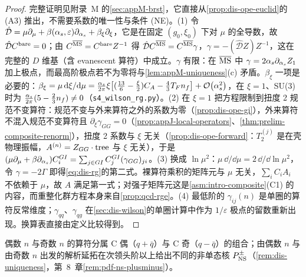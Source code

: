 \begin{proof}
完整证明见附录~M 的\cref{sec:appM-brst}，它直接从\cref{prop:dis-ope-euclid}的 (A3) 推出，不需要系数的唯一性与条件 (NE)。(1) 令 $\hat{\mathcal D}=\mu\partial_\mu+\beta(\alpha_s,\varepsilon)\partial_{\alpha_s}+\beta_\xi\partial_\xi$，它是在固定 $(g_0,\xi_0)$ 下对 $\mu$ 的全导数，故 $\hat{\mathcal D}C^{\rm bare}=0$；由 $C^{\overline{\rm MS}}=C^{\rm bare}Z^{-1}$ 得 $\hat{\mathcal D}C^{\overline{\rm MS}}=C^{\overline{\rm MS}}\gamma$，$\gamma=-(\hat{\mathcal D}Z)Z^{-1}$，这在完整的 $D$ 维基（含 evanescent 算符）中成立。$\gamma$ 有限：在 $\overline{\rm MS}$ 中 $\gamma=2\alpha_s\partial_{\alpha_s}Z_1$ 加上极点，而最高阶极点若不为零将与\cref{lem:appM-uniqueness}(c) 矛盾。$\beta_\xi$ 一项是必要的：$\beta_\xi=\mu\,\mathrm{d}\xi/\mathrm{d}\mu=\frac{\alpha_s}{2\pi}\xi\big[(\frac{13}6-\frac\xi2)C_A-\frac43T_Fn_f\big]+\mathcal{O}\!\left(\alpha_s^2\right)$，在 $\xi=1$、SU(3) 时为 $\frac{\alpha_s}{2\pi}(5-\frac23n_f)\ne0$（\texttt{s4\_wilson\_rg.py}）。(2) 在 $\xi=1$ 把方程限制到扭度 2 规范不变算符：规范不变与外来算符之外的系数为零（\cref{prop:dis-ope-gi}），外来算符不混入规范不变算符且 $\partial_\xi\gamma_{GG}=0$（\cref{prop:appJ-local-operators}、\cref{thm:prelim-composite-renorm}），扭度 2 系数与 $\xi$ 无关（\cref{prop:dis-ope-forward}：$T^{(j)}_2$ 是在壳物理振幅，$A^{(n)}=Z_{GG}\cdot{\rm tree}$ 与 $\xi$ 无关），于是 $(\mu\partial_\mu+\beta\partial_{\alpha_s})C^{GI}_i=\sum_{j\in GI}C^{GI}_j(\gamma_{GG})_{ji}$。(3) 换成 $\ln\mu^2$：$\mu\,\dd/\dd\mu=2\,\dd/\dd\ln\mu^2$，令 $\gamma=-2\Gamma$ 即得\cref{eq:dis-rg}的第二式。裸算符乘积的矩阵元与 $\mu$ 无关，$\sum_iC_iA_i$ 不依赖于 $\mu$，故 $A$ 满足第一式；对强子矩阵元这是\cref{asm:intro-composite}(C1) 的内容，而重整化群方程本身来自\cref{prop:qcd-rge}。(4) 最低阶的 $\gamma_{ij}(n)$ 是单圈的算符反常维度；$\gamma_{qq}$、$\gamma_{qg}$ 在\cref{sec:dis-wilson}的单圈计算中作为 $1/\varepsilon$ 极点的留数重新出现。换算表直接由定义比较得到。
\end{proof}

偶数 $n$ 与奇数 $n$ 的算符分属 C 偶（$q+\bar q$）与 C 奇（$q-\bar q$）的组合；由偶数 $n$ 与由奇数 $n$ 出发的解析延拓在次领头阶以上给出不同的非单态核 $P^\pm_{\rm NS}$（\cref{rem:dis-uniqueness}，第~8~章\cref{rem:pdf-ns-plusminus}）。
